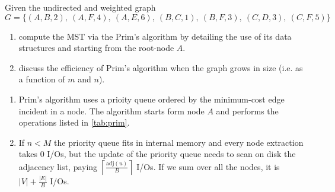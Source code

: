 \exercise

Given the undirected and weighted graph $$G = \big\{ (A, B, 2),\ (A, F, 4),\ (A,
E, 6),\ (B, C, 1),\ (B, F, 3),\ (C, D, 3),\ (C, F, 5) \big\}$$
%
\begin{enumerate}

  \item compute the MST via the Prim's algorithm by detailing the use of its
  data structures and starting from the root-node $A$.

  \item discuss the efficiency of Prim's algorithm when the graph grows in size
  (i.e. as a function of $m$ and $n$).

\end{enumerate}

\solution

\begin{enumerate}

  \item Prim's algorithm uses a prioity queue ordered by the minimum-cost edge
  incident in a node. The algorithm starts form node $A$ and performs the
  operations listed in \autoref{tab:prim}.

  \item If $n < M$ the priority queue fits in internal memory and every node
  extraction takes 0 I/Os, but the update of the priority queue needs to scan on
  disk the adjacency list, paying
  $\left\lceil\frac{\text{adj}(u)}{B}\right\rceil$ I/Os. If we sum over all the
  nodes, it is $|V| + \frac{|E|}{B}$ I/Os.

\end{enumerate}
%
